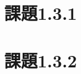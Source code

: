 \documentclass[uplatex, 11pt,a4j, titlepage]{jsarticle}
\begin{document}
\section{課題1.3.1}
\section{課題1.3.2}


\newpage
\thispagestyle{empty}
\nocite{key1}
\nocite{key2}


\end{document}

